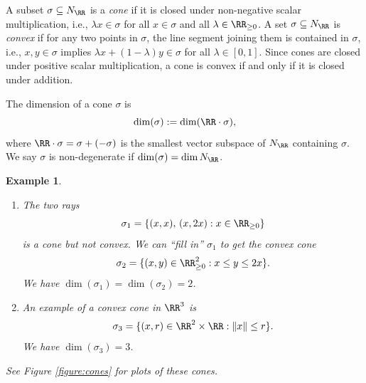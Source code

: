 \documentclass[12pt]{amsart}
\theoremstyle{plain}
\newtheorem{example}[theorem]{Example}
\begin{document}
A subset $\sigma \subseteq N_\RR$ is a \emph{cone} if it is closed under non-negative scalar multiplication, i.e., $\lambda x \in \sigma$ for all $x \in \sigma$ and all $\lambda \in \RR_{\ge 0}$.
A set $\sigma \subseteq N_\RR$ is \emph{convex} if for any two points in $\sigma$, the line segment joining them is contained in $\sigma$,
i.e., $x, y \in \sigma$ implies $\lambda x + (1 - \lambda) y \in \sigma$ for all $\lambda \in [0, 1]$.
Since cones are closed under positive scalar multiplication, a cone is convex if and only if it is closed under addition.

The dimension of a cone $\sigma$ is
$$\dim(\sigma) := \dim(\RR \cdot \sigma),$$
where $\RR\cdot\sigma = \sigma + (-\sigma)$ is the smallest vector subspace of $N_\RR$ containing $\sigma$.
We say $\sigma$ is non-degenerate if $\dim(\sigma) = \dim N_\RR$.

\begin{example}\label{example:cones}
\begin{enumerate}
\item
The two rays
$$\sigma_1 = \{(x, x), \, (x, 2x) : x \in \RR_{\ge 0}\}$$
is a cone but not convex.
We can ``fill in'' $\sigma_1$ to get the convex cone
$$\sigma_2 = \{(x, y) \in \RR_{\ge 0}^2 : x \le y \le 2 x\}.$$
We have $\dim (\sigma_1) = \dim(\sigma_2)=2$.

\item
An example of a convex cone in $\RR^3$ is
$$\sigma_3 = \{(x, r) \in \RR^2 \times \RR : \|x\| \le r\}.$$
We have $\dim(\sigma_3)=3$.
\end{enumerate}
\noindent
See Figure \ref{figure:cones} for plots of these cones.
\end{example}
\end{document}
